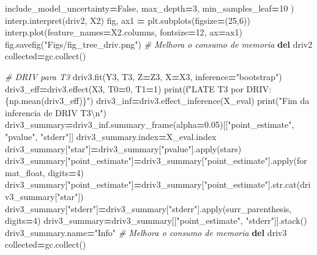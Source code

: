 \documentclass[
]{article}
\newenvironment{Shaded}{\begin{snugshade}}{\end{snugshade}}
\newcommand{\BuiltInTok}[1]{#1}
\newcommand{\CharTok}[1]{\textcolor[rgb]{0.31,0.60,0.02}{#1}}
\newcommand{\CommentTok}[1]{\textcolor[rgb]{0.56,0.35,0.01}{\textit{#1}}}
\newcommand{\DecValTok}[1]{\textcolor[rgb]{0.00,0.00,0.81}{#1}}
\newcommand{\FloatTok}[1]{\textcolor[rgb]{0.00,0.00,0.81}{#1}}
\newcommand{\KeywordTok}[1]{\textcolor[rgb]{0.13,0.29,0.53}{\textbf{#1}}}
\newcommand{\NormalTok}[1]{#1}
\newcommand{\OperatorTok}[1]{\textcolor[rgb]{0.81,0.36,0.00}{\textbf{#1}}}
\newcommand{\SpecialCharTok}[1]{\textcolor[rgb]{0.00,0.00,0.00}{#1}}
\newcommand{\SpecialStringTok}[1]{\textcolor[rgb]{0.31,0.60,0.02}{#1}}
\newcommand{\StringTok}[1]{\textcolor[rgb]{0.31,0.60,0.02}{#1}}
\newcommand{\VariableTok}[1]{\textcolor[rgb]{0.00,0.00,0.00}{#1}}
\begin{document}
\begin{Shaded}
\begin{Highlighting}[]
{{\NormalTok{    include_model_uncertainty}\OperatorTok{=}\VariableTok{False}\NormalTok{, }
\NormalTok{    max_depth}\OperatorTok{=}\DecValTok{3}\NormalTok{, }
\NormalTok{    min_samples_leaf}\OperatorTok{=}\DecValTok{10}
\NormalTok{)}
\NormalTok{interp.interpret(driv2, X2)}
\NormalTok{fig, ax1 }\OperatorTok{=}\NormalTok{ plt.subplots(figsize}\OperatorTok{=}\NormalTok{(}\DecValTok{25}\NormalTok{,}\DecValTok{6}\NormalTok{))}
\NormalTok{interp.plot(feature_names}\OperatorTok{=}\NormalTok{X2.columns, fontsize}\OperatorTok{=}\DecValTok{12}\NormalTok{, ax}\OperatorTok{=}\NormalTok{ax1)}
\NormalTok{fig.savefig(}\StringTok{"Figs/fig_tree_driv.png"}\NormalTok{)}
\CommentTok{# Melhora o consumo de memoria}
\KeywordTok{del}\NormalTok{ driv2}
\NormalTok{collected}\OperatorTok{=}\NormalTok{gc.collect()}

\CommentTok{# DRIV para T3}
\NormalTok{driv3.fit(Y3, T3, Z}\OperatorTok{=}\NormalTok{Z3, X}\OperatorTok{=}\NormalTok{X3, inference}\OperatorTok{=}\StringTok{"bootstrap"}\NormalTok{)}
\NormalTok{driv3_eff}\OperatorTok{=}\NormalTok{driv3.effect(X3, T0}\OperatorTok{=}\DecValTok{0}\NormalTok{, T1}\OperatorTok{=}\DecValTok{1}\NormalTok{)}
\BuiltInTok{print}\NormalTok{(}\SpecialStringTok{f"LATE T3 por DRIV: }\SpecialCharTok{\{np.}\NormalTok{mean(driv3_eff)}\SpecialCharTok{\}}\SpecialStringTok{"}\NormalTok{)}
\NormalTok{driv3_inf}\OperatorTok{=}\NormalTok{driv3.effect_inference(X_eval)}
\BuiltInTok{print}\NormalTok{(}\StringTok{"Fim da inferencia de DRIV T3}\CharTok{\textbackslash{}n}\StringTok{"}\NormalTok{)}
\NormalTok{driv3_summary}\OperatorTok{=}\NormalTok{driv3_inf.summary_frame(alpha}\OperatorTok{=}\FloatTok{0.05}\NormalTok{)[[}\StringTok{"point_estimate"}\NormalTok{, }\StringTok{"pvalue"}\NormalTok{, }\StringTok{"stderr"}\NormalTok{]]}
\NormalTok{driv3_summary.index}\OperatorTok{=}\NormalTok{X_eval.index}
\NormalTok{driv3_summary[}\StringTok{"star"}\NormalTok{]}\OperatorTok{=}\NormalTok{driv3_summary[}\StringTok{"pvalue"}\NormalTok{].}\BuiltInTok{apply}\NormalTok{(stars)}
\NormalTok{driv3_summary[}\StringTok{"point_estimate"}\NormalTok{]}\OperatorTok{=}\NormalTok{driv3_summary[}\StringTok{"point_estimate"}\NormalTok{].}\BuiltInTok{apply}\NormalTok{(format_float, digits}\OperatorTok{=}\DecValTok{4}\NormalTok{)}
\NormalTok{driv3_summary[}\StringTok{"point_estimate"}\NormalTok{]}\OperatorTok{=}\NormalTok{driv3_summary[}\StringTok{"point_estimate"}\NormalTok{].}\BuiltInTok{str}\NormalTok{.cat(driv3_summary[}\StringTok{"star"}\NormalTok{])}
\NormalTok{driv3_summary[}\StringTok{"stderr"}\NormalTok{]}\OperatorTok{=}\NormalTok{driv3_summary[}\StringTok{"stderr"}\NormalTok{].}\BuiltInTok{apply}\NormalTok{(surr_parenthesis, digits}\OperatorTok{=}\DecValTok{4}\NormalTok{)}
\NormalTok{driv3_summary}\OperatorTok{=}\NormalTok{driv3_summary[[}\StringTok{"point_estimate"}\NormalTok{, }\StringTok{"stderr"}\NormalTok{]].stack()}
\NormalTok{driv3_summary.name}\OperatorTok{=}\StringTok{"Info"}
\CommentTok{# Melhora o consumo de memoria}
\KeywordTok{del}\NormalTok{ driv3}
\NormalTok{collected}\OperatorTok{=}\NormalTok{gc.collect()}

}}
\end{Highlighting}
\end{Shaded}
\end{document}
